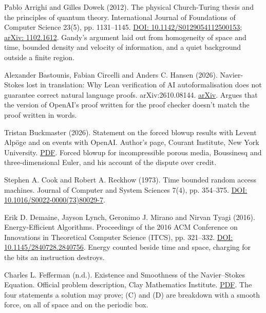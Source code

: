 \documentclass[11pt,twoside]{article}
\theoremstyle{thielethm}
\theoremstyle{thieledef}
\theoremstyle{thieledef}
\theoremstyle{thieledef}
\theoremstyle{thielethm}
\theoremstyle{thieleobs}
\theoremstyle{thielethm}
\begin{document}
\noindent Pablo Arrighi and Gilles Dowek (2012). The physical Church-Turing thesis and the principles of quantum theory. International Journal of Foundations of Computer Science 23(5), pp. 1131--1145. \href{https://doi.org/10.1142/S0129054112500153}{DOI: 10.1142/S0129054112500153}; \href{https://arxiv.org/abs/1102.1612}{arXiv: 1102.1612}. Gandy's argument laid out from homogeneity of space and time, bounded density and velocity of information, and a quiet background outside a finite region.
\par\medskip

\noindent Alexander Bastounis, Fabian Circelli and Anders C. Hansen (2026). Navier-Stokes lost in translation: Why Lean verification of AI autoformalisation does not guarantee correct natural language proofs. arXiv:2610.08144. \href{https://arxiv.org/abs/2610.08144}{arXiv}. Argues that the version of OpenAI's proof written for the proof checker doesn't match the proof written in words.
\par\medskip

\noindent Tristan Buckmaster (2026). Statement on the forced blowup results with Levent Alp\"oge and on events with OpenAI. Author's page, Courant Institute, New York University. \href{https://cims.nyu.edu/~tristanb/statement.pdf}{PDF}. Forced blowup for incompressible porous media, Boussinesq and three-dimensional Euler, and his account of the dispute over credit.
\par\medskip

\noindent Stephen A. Cook and Robert A. Reckhow (1973). Time bounded random access machines. Journal of Computer and System Sciences 7(4), pp. 354--375. \href{https://doi.org/10.1016/S0022-0000(73)80029-7}{DOI: 10.1016/S0022-0000(73)80029-7}.
\par\medskip

\noindent Erik D. Demaine, Jayson Lynch, Geronimo J. Mirano and Nirvan Tyagi (2016). Energy-Efficient Algorithms. Proceedings of the 2016 ACM Conference on Innovations in Theoretical Computer Science (ITCS), pp. 321--332. \href{https://doi.org/10.1145/2840728.2840756}{DOI: 10.1145/2840728.2840756}. Energy counted beside time and space, charging for the bits an instruction destroys.
\par\medskip

\noindent Charles L. Fefferman (n.d.). Existence and Smoothness of the Navier--Stokes Equation. Official problem description, Clay Mathematics Institute. \href{https://www.claymath.org/wp-content/uploads/2022/06/navierstokes.pdf}{PDF}. The four statements a solution may prove; (C) and (D) are breakdown with a smooth force, on all of space and on the periodic box.
\par\medskip
\end{document}
